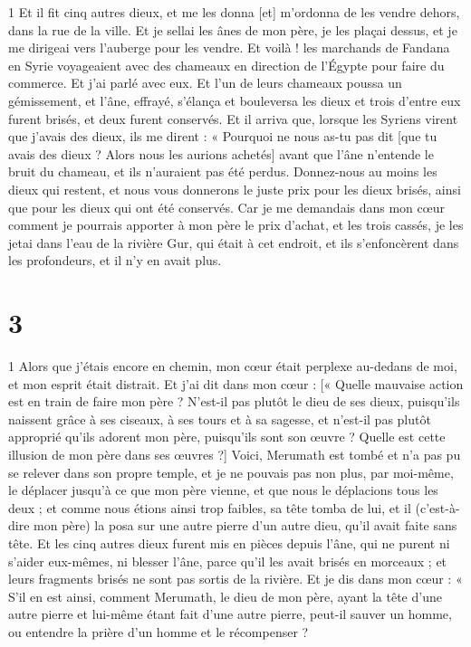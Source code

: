 \par 1 Et il fit cinq autres dieux, et me les donna [et] m'ordonna de les vendre dehors, dans la rue de la ville. Et je sellai les ânes de mon père, je les plaçai dessus, et je me dirigeai vers l'auberge pour les vendre. Et voilà ! les marchands de Fandana en Syrie voyageaient avec des chameaux en direction de l'Égypte pour faire du commerce. Et j'ai parlé avec eux. Et l'un de leurs chameaux poussa un gémissement, et l'âne, effrayé, s'élança et bouleversa les dieux et trois d'entre eux furent brisés, et deux furent conservés. Et il arriva que, lorsque les Syriens virent que j'avais des dieux, ils me dirent : « Pourquoi ne nous as-tu pas dit [que tu avais des dieux ? Alors nous les aurions achetés] avant que l'âne n'entende le bruit du chameau, et ils n'auraient pas été perdus. Donnez-nous au moins les dieux qui restent, et nous vous donnerons le juste prix pour les dieux brisés, ainsi que pour les dieux qui ont été conservés. Car je me demandais dans mon cœur comment je pourrais apporter à mon père le prix d'achat, et les trois cassés, je les jetai dans l'eau de la rivière Gur, qui était à cet endroit, et ils s'enfoncèrent dans les profondeurs, et il n'y en avait plus.

\chapter{3}

\par 1 Alors que j'étais encore en chemin, mon cœur était perplexe au-dedans de moi, et mon esprit était distrait. Et j’ai dit dans mon cœur : [« Quelle mauvaise action est en train de faire mon père ? N'est-il pas plutôt le dieu de ses dieux, puisqu'ils naissent grâce à ses ciseaux, à ses tours et à sa sagesse, et n'est-il pas plutôt approprié qu'ils adorent mon père, puisqu'ils sont son œuvre ? Quelle est cette illusion de mon père dans ses œuvres ?] Voici, Merumath est tombé et n'a pas pu se relever dans son propre temple, et je ne pouvais pas non plus, par moi-même, le déplacer jusqu'à ce que mon père vienne, et que nous le déplacions tous les deux ; et comme nous étions ainsi trop faibles, sa tête tomba de lui, et il (c'est-à-dire mon père) la posa sur une autre pierre d'un autre dieu, qu'il avait faite sans tête. Et les cinq autres dieux furent mis en pièces depuis l'âne, qui ne purent ni s'aider eux-mêmes, ni blesser l'âne, parce qu'il les avait brisés en morceaux ; et leurs fragments brisés ne sont pas sortis de la rivière. Et je dis dans mon cœur : « S'il en est ainsi, comment Merumath, le dieu de mon père, ayant la tête d'une autre pierre et lui-même étant fait d'une autre pierre, peut-il sauver un homme, ou entendre la prière d'un homme et le récompenser ?

